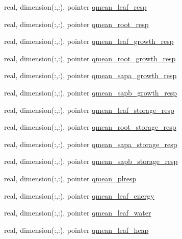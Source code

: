 \begin{DoxyCompactItemize}
\item 
real, dimension(\+:,\+:), pointer \hyperlink{structed__state__vars_1_1edtype_a55a87b020098998c66cfcd2cf8763a8f}{qmean\+\_\+leaf\+\_\+resp}
\item 
real, dimension(\+:,\+:), pointer \hyperlink{structed__state__vars_1_1edtype_ad172b0b42b8b12821d91aca730fe9601}{qmean\+\_\+root\+\_\+resp}
\item 
real, dimension(\+:,\+:), pointer \hyperlink{structed__state__vars_1_1edtype_a3d7d45c7c3e552322ad53d1662d415c8}{qmean\+\_\+leaf\+\_\+growth\+\_\+resp}
\item 
real, dimension(\+:,\+:), pointer \hyperlink{structed__state__vars_1_1edtype_a64d44721daffc53ae4b269d9ca818611}{qmean\+\_\+root\+\_\+growth\+\_\+resp}
\item 
real, dimension(\+:,\+:), pointer \hyperlink{structed__state__vars_1_1edtype_a58f445194b69841b9be9b43c8d57b610}{qmean\+\_\+sapa\+\_\+growth\+\_\+resp}
\item 
real, dimension(\+:,\+:), pointer \hyperlink{structed__state__vars_1_1edtype_a2a121633849662ebbb7416d6d12d1852}{qmean\+\_\+sapb\+\_\+growth\+\_\+resp}
\item 
real, dimension(\+:,\+:), pointer \hyperlink{structed__state__vars_1_1edtype_a3916e29f5c710a4e7fc85e76aedec9d5}{qmean\+\_\+leaf\+\_\+storage\+\_\+resp}
\item 
real, dimension(\+:,\+:), pointer \hyperlink{structed__state__vars_1_1edtype_a53991e3097eae0685fe28864cc15965b}{qmean\+\_\+root\+\_\+storage\+\_\+resp}
\item 
real, dimension(\+:,\+:), pointer \hyperlink{structed__state__vars_1_1edtype_adbbfa01ced60dd28feeda23ba1575cf8}{qmean\+\_\+sapa\+\_\+storage\+\_\+resp}
\item 
real, dimension(\+:,\+:), pointer \hyperlink{structed__state__vars_1_1edtype_a6ff3f8829d1f12ab4b66b62933c2b824}{qmean\+\_\+sapb\+\_\+storage\+\_\+resp}
\item 
real, dimension(\+:,\+:), pointer \hyperlink{structed__state__vars_1_1edtype_a042d24b9f3dbe952a995a8a12f0dc9fd}{qmean\+\_\+plresp}
\item 
real, dimension(\+:,\+:), pointer \hyperlink{structed__state__vars_1_1edtype_aece3f30f39cc4af99e34b7e1ba69ce32}{qmean\+\_\+leaf\+\_\+energy}
\item 
real, dimension(\+:,\+:), pointer \hyperlink{structed__state__vars_1_1edtype_ab1910861bd496066a9658bbaa6accf45}{qmean\+\_\+leaf\+\_\+water}
\item 
real, dimension(\+:,\+:), pointer \hyperlink{structed__state__vars_1_1edtype_a5e1c112c223ad46e2f84d46dac360409}{qmean\+\_\+leaf\+\_\+hcap}

\end{DoxyCompactItemize}
